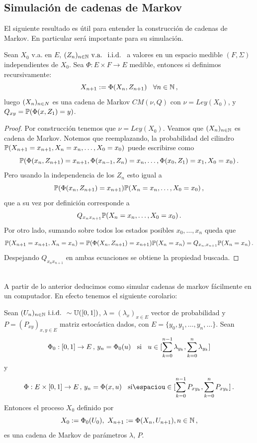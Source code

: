 \subsection{Simulación de cadenas de Markov}
El siguiente resultado es útil para entender la construcción de cadenas de Markov. En particular será importante para su simulación.
\begin{proposition}
\label{propsimmarkov}
Sean $X_0$ v.a. en $E$, $(Z_n)_{n\in\N}\mbox{ v.a. }\iid$ a valores en un espacio medible $(F,\Sigma)$ independientes de $X_0$. Sea $\Phi:E\times F\to E$ medible, entonces si definimos recursivamente:
$$X_{n+1}:=\Phi(X_n,Z_{n+1}) \espacio \forall n\in\N \, ,$$
luego $\xcm$ es una cadena de Markov $CM(\nu,Q)$ con $\nu=Ley(X_0)$, y $Q_{xy}=\P(\Phi(x,Z_1)=y)$.
\end{proposition}
\begin{proof} \newline
\gris
Por construcción tenemos que $\nu=Ley(X_0)$. \newline Veamos que $(X_n)_{n\in\N}$ es cadena de Markov. Notemos que reemplazando, la probabilidad del cilindro $\P(X_{n+1}=x_{n+1},X_n=x_n,\dots,X_0=x_0)$ puede escribirse como
$$ \P(\Phi(x_n,Z_{n+1})=x_{n+1},\Phi(x_{n-1},Z_n)=x_n,\dots,\Phi(x_0,Z_1)=x_1,X_0=x_0) \, .$$
Pero usando la independencia de los $Z_n$ esto igual a 
$$ \P(\Phi(x_n,Z_{n+1})=x_{n+1})\P(X_n=x_n,\dots,X_0=x_0) \, ,$$
que a su vez por definición corresponde a
$$ Q_{x_nx_{n+1}}\P(X_n=x_n,\dots,X_0=x_0)\, . $$
Por otro lado, sumando sobre todos los estados posibles $x_0,\dots,x_n$ queda que 
$$ \P(X_{n+1}=x_{n+1},X_n=x_n) = \P(\Phi(X_n,Z_{n+1})=x_{n+1})\P(X_n=x_n)=Q_{x_n,x_{n+1}}\P(X_n=x_n) \, .$$
Despejando $Q_{x_nx_{n+1}}$ en ambas ecuaciones se obtiene la propiedad buscada. \findem
\negro
\end{proof}
\vspace{.5cm}\\
A partir de lo anterior deducimos como simular cadenas de markov fácilmente en un computador. En efecto tenemos el siguiente corolario:
\begin{corolary}
Sean $(U_n)_{n\in\N} \iid \sim\unif$, $\lambda=(\lambda_x)_{x\in E}$ vector de probabilidad y $P=(P_{xy})_{x,y\in E}$ matriz estocástica dados, con $E=\{y_0,y_1,\dots,y_n,\dots\}$. %
Sean 
$$ \Phi_0:[0,1]\to E \, ,\, y_n=\Phi_0(u)\espacio\mbox{si}\espacio u\in[\displaystyle\sum^{n-1}_{k=0}\lambda_{y_k},\sum^n_{k=0}\lambda_{y_k}]$$
y
$$ \Phi:E\times[0,1]\to E\,,\,y_n=\Phi(x,u)\espacio\mbox{si}\espaciou\in[\displaystyle\sum^{n-1}_{k=0}P_{xy_k},\sum^n_{k=0}P_{xy_k}] \, .$$
Entonces el proceso $X_0$ definido por
$$ X_0:=\Phi_0(U_0), \mbox{ }X_{n+1}:=\Phi(X_n,U_{n+1}), n\in\N\, ,$$
es una cadena de Markov de parámetros $\lambda$, $P$.
\end{corolary}
